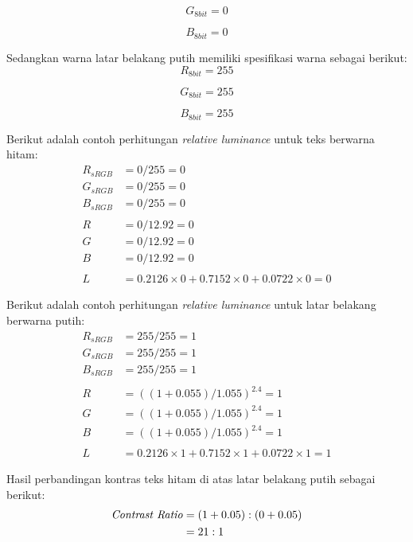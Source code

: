 \begin{equation}
G_{8bit} = 0
\end{equation}

\begin{equation}
B_{8bit} = 0
\end{equation}

Sedangkan warna latar belakang putih memiliki spesifikasi warna sebagai berikut:
\begin{equation}
R_{8bit} = 255
\end{equation}

\begin{equation}
G_{8bit} = 255
\end{equation}

\begin{equation}
B_{8bit} = 255
\end{equation}

Berikut adalah contoh perhitungan \textit{relative luminance} untuk teks berwarna hitam:
\begin{align*}
R_{sRGB} &= 0 / 255 = 0 \\
G_{sRGB} &= 0 / 255 = 0 \\
B_{sRGB} &= 0 / 255 = 0 \\
\\
R &= 0/12.92 = 0 \\
G &= 0/12.92 = 0 \\
B &= 0/12.92 = 0 \\
\\
L &= 0.2126 \times 0 + 0.7152 \times 0 + 0.0722 \times 0 = 0
\end{align*}

Berikut adalah contoh perhitungan \textit{relative luminance} untuk latar belakang berwarna putih:
\begin{align*}
R_{sRGB} &= 255 / 255 = 1 \\
G_{sRGB} &= 255 / 255 = 1 \\
B_{sRGB} &= 255 / 255 = 1 \\
\\
R &= ((1 + 0.055)/1.055)^{2.4} = 1 \\
G &= ((1 + 0.055)/1.055)^{2.4} = 1 \\
B &= ((1 + 0.055)/1.055)^{2.4} = 1 \\
\\
L &= 0.2126 \times 1 + 0.7152 \times 1 + 0.0722 \times 1 = 1
\end{align*}

Hasil perbandingan kontras teks hitam di atas latar belakang putih sebagai berikut:
\begin{align*}
\text{\textit{Contrast Ratio}} &= (1 + 0.05) : (0 +0.05) \\
&= 21 : 1
\end{align*}

